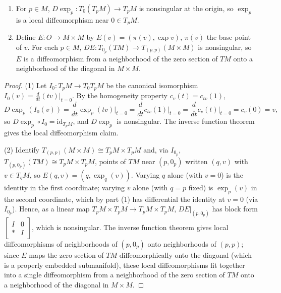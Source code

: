 \begin{proposition}
  \label{prop:pet-ch5-exp-diffeomorphism-properties}
  \begin{enumerate}
  \item For $p\in M$, $D\exp_p:T_0(T_pM)\to T_pM$ is nonsingular at the origin, so
  $\exp_p$ is a local diffeomorphism near $0\in T_pM$.
  \item Define $E:O\to M\times M$ by $E(v)=(\pi(v),\exp v)$, $\pi(v)$ the base point
  of $v$. For each $p\in M$, $DE:T_{0_p}(TM)\to T_{(p,p)}(M\times M)$ is nonsingular,
  so $E$ is a diffeomorphism from a neighborhood of the zero section of $TM$ onto a
  neighborhood of the diagonal in $M\times M$.
  \end{enumerate}
\end{proposition}
\begin{proof}
  (1) Let $I_0:T_pM\to T_0T_pM$ be the canonical isomorphism
  $I_0(v)=\frac{d}{dt}(tv)|_{t=0}$. By the homogeneity property $c_v(t)=c_{tv}(1)$,
  \[
    D\exp_p(I_0(v))=\frac{d}{dt}\exp_p(tv)\Big|_{t=0}
    =\frac{d}{dt}c_{tv}(1)\Big|_{t=0}=\frac{d}{dt}c_v(t)\Big|_{t=0}=\dot c_v(0)=v,
  \]
  so $D\exp_p\circ I_0=\mathrm{id}_{T_pM}$, and $D\exp_p$ is nonsingular. The inverse
  function theorem gives the local diffeomorphism claim.

  (2) Identify $T_{(p,p)}(M\times M)\cong T_pM\times T_pM$ and, via $I_{0_p}$,
  $T_{(p,0_p)}(TM)\cong T_pM\times T_pM$, points of $TM$ near $(p,0_p)$ written
  $(q,v)$ with $v\in T_qM$, so $E(q,v)=(q,\exp_q(v))$. Varying $q$ alone (with $v=0$)
  is the identity in the first coordinate; varying $v$ alone (with $q=p$ fixed) is
  $\exp_p(v)$ in the second coordinate, which by part (1) has differential the
  identity at $v=0$ (via $I_{0_p}$). Hence, as a linear map $T_pM\times T_pM\to
  T_pM\times T_pM$, $DE|_{(p,0_p)}$ has block form $\begin{bmatrix}I&0\\ *&I
  \end{bmatrix}$, which is nonsingular. The inverse function theorem gives local
  diffeomorphisms of neighborhoods of $(p,0_p)$ onto neighborhoods of $(p,p)$; since
  $E$ maps the zero section of $TM$ diffeomorphically onto the diagonal (which is a
  properly embedded submanifold), these local diffeomorphisms fit together into a
  single diffeomorphism from a neighborhood of the zero section of $TM$ onto a
  neighborhood of the diagonal in $M\times M$.
\end{proof}

